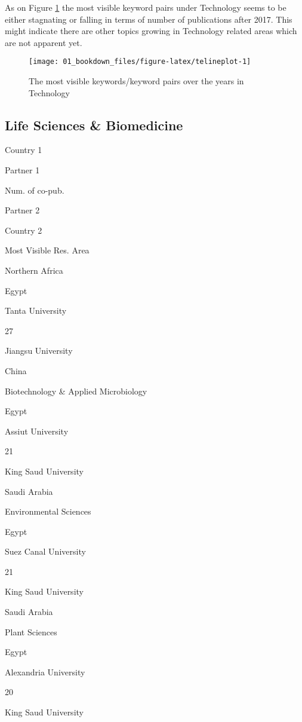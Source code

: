 \documentclass[12pt,twoside]{report}
\begin{document}
As on Figure \ref{fig:telineplot} the most visible keyword pairs under Technology seems to be either stagnating or falling in terms of number of publications after 2017. This might indicate there are other topics growing in Technology related areas which are not apparent yet.

\begin{figure}
\texttt{[image: 01\_bookdown\_files/figure-latex/telineplot-1]} \caption{The most visible keywords/keyword pairs over the years in Technology}\label{fig:telineplot}
\end{figure}

\hypertarget{life-sciences-biomedicine}{%
\subsection{Life Sciences \& Biomedicine}\label{life-sciences-biomedicine}}

Country 1

Partner 1

Num. of co-pub.

Partner 2

Country 2

Most Visible Res. Area

Northern Africa

{Egypt }

{Tanta University }

{27}

{Jiangsu University }

{China }

{Biotechnology \& Applied Microbiology}

{Egypt }

{Assiut University }

{21}

{King Saud University }

{Saudi Arabia }

{Environmental Sciences }

{Egypt }

{Suez Canal University }

{21}

{King Saud University }

{Saudi Arabia }

{Plant Sciences }

{Egypt }

{Alexandria University }

{20}

{King Saud University }
\end{document}
